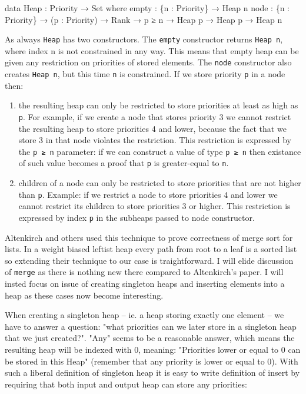 \begin{code}
data Heap : Priority → Set where
  empty : \{n : Priority\} → Heap n
  node  : \{n : Priority\} → (p : Priority) → Rank → p ≥ n →
          Heap p → Heap p → Heap n
\end{code}
\noindent
As always \texttt{Heap} has two constructors. The \texttt{empty} constructor returns \texttt{Heap n}, where index n is not constrained in any way. This means that empty heap can be given any restriction on priorities of stored elements. The \texttt{node} constructor also creates \texttt{Heap n}, but this time \texttt{n} is constrained. If we store priority \texttt{p} in a node then:

\begin{enumerate}
 \item the resulting heap can only be restricted to store priorities at least as high as \texttt{p}. For example, if we create a node that stores priority 3 we cannot restrict the resulting heap to store priorities 4 and lower, because the fact that we store 3 in that node violates the restriction. This restriction is expressed by the \texttt{p ≥ n} parameter: if we can construct a value of type \texttt{p ≥ n} then existance of such value becomes a proof that \texttt{p} is greater-equal to \texttt{n}.
 \item children of a node can only be restricted to store priorities that are not higher than \texttt{p}. Example: if we restrict a node to store priorities 4 and lower we cannot restrict its children to store priorities 3 or higher. This restriction is expressed by index \texttt{p} in the subheaps passed to node constructor.
\end{enumerate}

Altenkirch and others used this technique to prove correctness of merge sort for lists. In a weight biased leftist heap every path from root to a leaf is a sorted list so extending their technique to our case is traightforward. I will elide discussion of \texttt{merge} as there is nothing new there compared to Altenkirch's paper. I will insted focus on issue of creating singleton heaps and inserting elements into a heap as these cases now become interesting.

When creating a singleton heap -- ie. a heap storing exactly one element -- we have to answer a question: "what priorities can we later store in a singleton heap that we just created?". "Any" seems to be a reasonable answer, which means the resulting heap will be indexed with 0, meaning: "Priorities lower or equal to 0 can be stored in this Heap" (remember that any priority is lower or equal to 0). With such a liberal definition of singleton heap it is easy to write definition of insert by requiring that both input and output heap can store any priorities:

